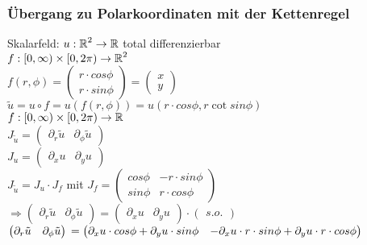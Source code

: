 \documentclass[german]{latex4ei/latex4ei_sheet}
\begin{document}
\subsubsection*{\"Ubergang zu Polarkoordinaten mit der Kettenregel}
Skalarfeld: $u: \operatorname{\mathbb R}^2 \rightarrow \operatorname{\mathbb R}$ total differenzierbar\\
$f: [0,\infty) \times [0,2\pi) \rightarrow \operatorname{\mathbb R}^2$\\
$f(r,\phi)=\begin{pmatrix}
r \cdot cos \phi \\ r \cdot sin \phi
\end{pmatrix} = \begin{pmatrix}
x \\ y
\end{pmatrix}$\\
$\tilde{u}=u \circ f=u(f(r,\phi))=u(r \cdot cos \phi, r \cot sin \phi)$\\
$f: [0,\infty) \times [0,2\pi) \rightarrow \operatorname{\mathbb R}$\\
$J_{\tilde{u}}=\begin{pmatrix}
\partial_r \tilde{u} & \partial_\phi \tilde{u}
\end{pmatrix}$\\
$J_{u}=\begin{pmatrix}
\partial_x u & \partial_y u
\end{pmatrix}$\\
$J_{\tilde{u}} = J_u \cdot J_f$ mit $J_f=\begin{pmatrix}
cos \phi & -r \cdot sin \phi \\  sin \phi & r \cdot cos \phi
\end{pmatrix}$\\
$\Rightarrow \begin{pmatrix}
\partial_r \tilde{u} & \partial_\phi \tilde{u}
\end{pmatrix} = \begin{pmatrix}
\partial_x u & \partial_y u
\end{pmatrix} \cdot \begin{pmatrix}
s.o.
\end{pmatrix}$\\
$\begin{pmatrix}
\partial_r \tilde{u} & \partial_\phi \tilde{u}
\end{pmatrix}\\ = \begin{pmatrix}
\partial_x u \cdot cos \phi + \partial_y u \cdot sin \phi & - \partial_x u \cdot r \cdot sin \phi + \partial_y u \cdot r \cdot cos \phi
\end{pmatrix}$\\
\end{document}
